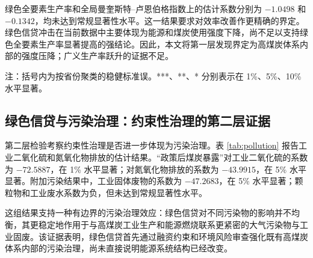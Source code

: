 \documentclass[UTF8,12pt]{ctexart}
\begin{document}
绿色全要素生产率和全局曼奎斯特--卢恩伯格指数上的估计系数分别为 $-1.0498$ 和 $-0.1342$，均未达到常规显著性水平。这一结果要求对效率改善作更精确的界定。绿色信贷冲击在当前数据中主要体现为能源和煤炭使用强度下降，尚不足以支持绿色全要素生产率显著提高的强结论。因此，本文将第一层发现界定为高煤炭体系内部的强度压降；广义生产率跃升的证据不足。

\begin{table}[htbp]
    \centering
    \caption{绿色信贷与能源强度压降：约束性治理的第一层证据}
    \label{tab:efficiency}
    \begin{flushleft}
    \footnotesize 注：括号内为按省份聚类的稳健标准误。***、**、* 分别表示在 1\%、5\%、10\% 水平显著。
    \end{flushleft}
\end{table}

\subsection{绿色信贷与污染治理：约束性治理的第二层证据}

第二层检验考察约束性治理是否进一步体现为污染治理。表 \ref{tab:pollution} 报告工业二氧化硫和氮氧化物排放的估计结果。“政策后煤炭暴露”对工业二氧化硫的系数为 $-72.5887$，在 1\% 水平显著；对氮氧化物排放的系数为 $-43.9915$，在 5\% 水平显著。附加污染结果中，工业固体废物的系数为 $-47.2683$，在 5\% 水平显著；颗粒物和工业废水系数为负，但未达到常规显著性水平。

这组结果支持一种有边界的污染治理效应：绿色信贷对不同污染物的影响并不均衡，其更稳定地作用于与高煤炭工业生产和能源燃烧联系更紧密的大气污染物与工业固废。该证据表明，绿色信贷首先通过融资约束和环境风险审查强化既有高煤炭体系内部的污染治理，尚未直接说明能源系统结构已经改变。
\end{document}
